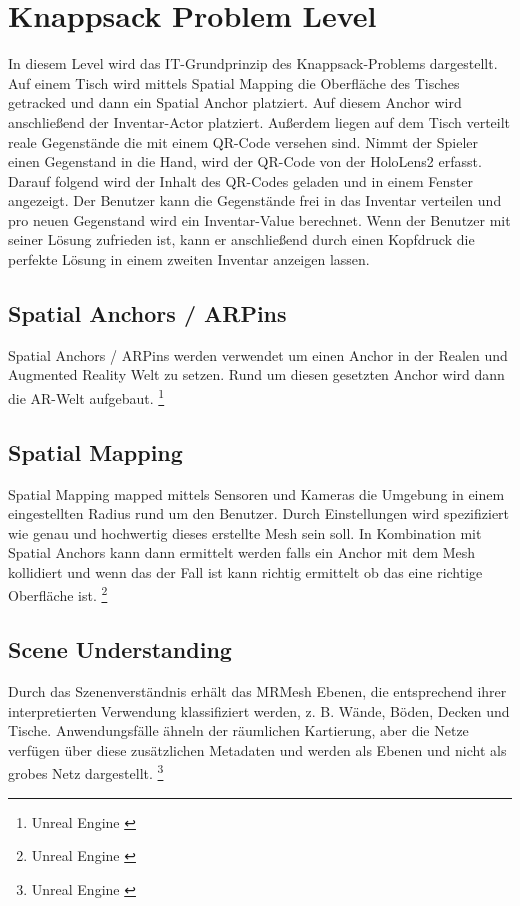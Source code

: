 \section{Knappsack Problem Level}
In diesem Level wird das IT-Grundprinzip des Knappsack-Problems dargestellt.
Auf einem Tisch wird mittels Spatial Mapping die Oberfläche des Tisches
getracked und dann ein Spatial Anchor platziert. Auf diesem Anchor wird
anschließend der Inventar-Actor platziert. Außerdem liegen auf dem Tisch
verteilt reale Gegenstände die mit einem QR-Code versehen sind. Nimmt der
Spieler einen Gegenstand in die Hand, wird der QR-Code von der HoloLens2
erfasst. Darauf folgend wird der Inhalt des QR-Codes geladen und in einem
Fenster angezeigt. Der Benutzer kann die Gegenstände frei in das Inventar
verteilen und pro neuen Gegenstand wird ein Inventar-Value berechnet.
Wenn der Benutzer mit seiner Lösung zufrieden ist, kann er anschließend
durch einen Kopfdruck die perfekte Lösung in einem zweiten Inventar anzeigen
lassen.

\subsection{Spatial Anchors / ARPins}
Spatial Anchors / ARPins werden verwendet um einen Anchor in der Realen und
Augmented Reality Welt zu setzen. Rund um diesen gesetzten Anchor wird dann die
AR-Welt aufgebaut. \footnote{Unreal Engine \cite{ARPins}}

\subsection{Spatial Mapping}
Spatial Mapping mapped mittels Sensoren und Kameras die Umgebung in einem
eingestellten Radius rund um den Benutzer. Durch Einstellungen wird spezifiziert
wie genau und hochwertig dieses erstellte Mesh sein soll. In Kombination mit
Spatial Anchors kann dann ermittelt werden falls ein Anchor mit dem Mesh kollidiert
und wenn das der Fall ist kann richtig ermittelt ob das eine richtige Oberfläche ist. \footnote{Unreal Engine \cite{Spatial-Mapping}}

\subsection{Scene Understanding}
Durch das Szenenverständnis erhält das MRMesh Ebenen, die entsprechend ihrer interpretierten
Verwendung klassifiziert werden, z. B. Wände, Böden, Decken und Tische. Anwendungsfälle ähneln
der räumlichen Kartierung, aber die Netze verfügen über diese zusätzlichen Metadaten und werden
als Ebenen und nicht als grobes Netz dargestellt.%
\footnote{Unreal Engine \cite{Scene-Understanding}}

